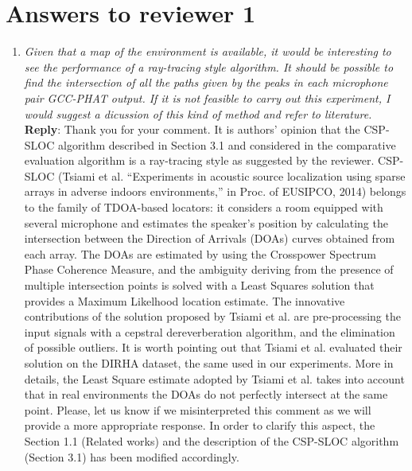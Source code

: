 \documentclass[11pt, technote, letterpaper, oneside, onecolumn]{IEEEtran}
\begin{document}
\section{Answers to reviewer 1}\label{sec:rev1}
\begin{enumerate}
\item \textit{Given that a map of the environment is available, it would be interesting to see the performance of a ray-tracing style algorithm. It should be possible to find the intersection of all the paths given by the peaks in each microphone pair GCC-PHAT output. If it is not feasible to carry out this experiment, I would suggest a dicussion of this kind of method and refer to literature.\\}
\textbf{Reply}: Thank you for your comment. It is authors' opinion that the CSP-SLOC algorithm described in Section 3.1 and considered in the comparative evaluation algorithm is a ray-tracing style  as suggested by the reviewer. CSP-SLOC (Tsiami et al. ``Experiments in acoustic source localization using sparse arrays in adverse indoors environments,'' in Proc. of EUSIPCO, 2014) belongs to the family of TDOA-based locators: it considers a room equipped with several microphone and estimates the speaker's position by calculating the intersection between the Direction of Arrivals (DOAs) curves obtained from each array. The DOAs are estimated by using the Crosspower Spectrum Phase Coherence Measure, and the ambiguity deriving from the presence of multiple intersection points is solved with a Least Squares solution that provides a Maximum Likelhood location estimate. The innovative contributions of the solution proposed by Tsiami et al. are pre-processing the input signals with a cepstral dereverberation algorithm, and the elimination of possible outliers. It is worth pointing out that Tsiami et al. evaluated their solution on the DIRHA dataset, the same used in our experiments. More in details, the Least Square estimate adopted by Tsiami et al. takes into account that in real environments the DOAs do not perfectly intersect at the same point. Please, let us know if we misinterpreted this comment as we will provide a more appropriate response. In order to clarify this aspect, the Section 1.1 (Related works) and the description of the CSP-SLOC algorithm (Section 3.1) has been modified accordingly.



\end{enumerate}
\end{document}
